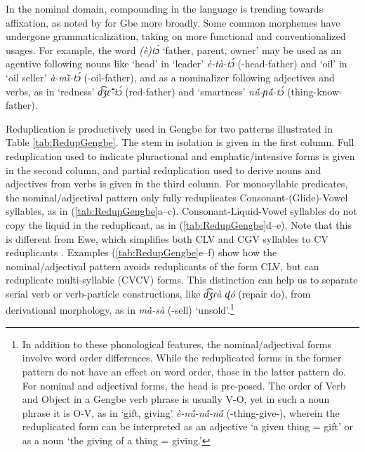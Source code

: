 \documentclass[output=paper,colorlinks,citecolor=brown]{langscibook}
\begin{document}
In the nominal domain, compounding in the language is trending towards affixation, as noted by \citet{Essegbey2006} for Gbe more broadly. Some common morphemes have undergone grammaticalization, taking on more functional and conventionalized usages. For example, the word \textit{(è)tɔ́} ‘father, parent, owner’ may be used as an agentive following nouns like `head' in ‘leader’ \textit{è-tà-tɔ́} (-head-father) and `oil' in ‘oil seller’ \textit{à-mĩ̀-tɔ́} (-oil-father), and as a nominalizer following adjectives and verbs, as in ‘redness’ \textit{d͡ʒɛ̃̌-tɔ́} (red-father) and ‘smartness’ \textit{nṹ-ɲã́-tɔ́} (thing-know-father).\largerpage

Reduplication  is productively used in Gengbe for two patterns illustrated in Table \ref{tab:RedupGengbe}. The stem in isolation is given in the first column. Full reduplication used to indicate pluractional and emphatic/intensive forms is given in the second column, and partial reduplication used to derive nouns and adjectives from verbs is given in the third column. For monosyllabic predicates, the nominal/adjectival pattern only fully reduplicates Consonant-(Glide)-Vowel syllables, as in (\ref{tab:RedupGengbe}a--c). Consonant-Liquid-Vowel syllables do not copy the liquid in the reduplicant, as in (\ref{tab:RedupGengbe}d--e). Note that this is different from Ewe, which simplifies both CLV and CGV syllables to CV reduplicants \citep{Stemberger&Lewis1986}. Examples (\ref{tab:RedupGengbe}e--f) show how the nominal/adjectival pattern avoids reduplicants of the form CLV, but can reduplicate multi-syllabic (CVCV) forms. This distinction can help us to separate serial verb or verb-particle constructions, like \textit{d͡ʒɾà ɖó} (repair do), from derivational morphology, as in \textit{mã̀-sà} (-sell) `unsold'.\footnote{In addition to these phonological features, the nominal/adjectival forms involve word order differences. While the reduplicated forms in the former pattern do not have an effect on word order, those in the latter pattern do. For nominal and adjectival forms, the head is pre-posed. The order of Verb and Object in a Gengbe verb phrase is usually V-O, yet in such a noun phrase it is O-V, as in ‘gift, giving’ \textit{è-nṹ-nã́-nã́} (-thing-give-), wherein the reduplicated form can be interpreted as an adjective ‘a given thing = gift’ or as a noun ‘the giving of a thing = giving.’}
\end{document}
